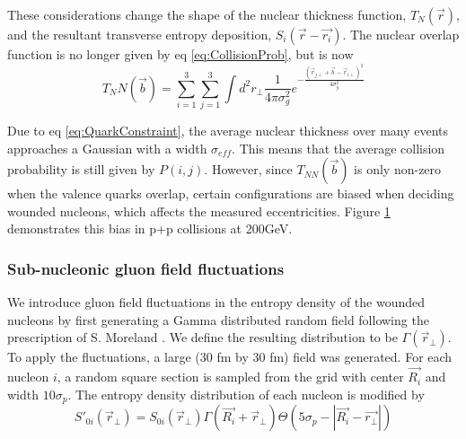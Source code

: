 \documentclass[preprint,showpacs,amsfonts,aps,prl,nofootinbib,floatfix]{revtex4}
\begin{document}
These considerations change the shape of the nuclear thickness function, $T_N(\vec{r})$, and the resultant transverse entropy deposition, $S_i(\vec{r}-\vec{r_i})$. The nuclear overlap function is no longer given by eq \ref{eq:CollisionProb}, but is now
\begin{equation}
	T_NN(\vec{b}) = \sum_{i=1}^{3}\sum_{j=1}^{3}\int{d^2r_\perp \frac{1}{4 \pi \sigma_g^2} e^{-\frac{(\vec{r}_{j\perp}+\vec{b}-\vec{r}_{i\perp})^2}{4 \sigma_g^2}}}
\end{equation}

Due to eq \ref{eq:QuarkConstraint}, the average nuclear thickness over many events approaches a Gaussian with a width $\sigma_{eff}$. This means that the average collision probability is still given by $P(i,j)$. However, since $T_{NN}(\vec{b})$ is only non-zero when the valence quarks overlap, certain configurations are biased when deciding wounded nucleons, which affects the measured eccentricities. Figure \ref{fig:CollisionComaprison} demonstrates this bias in p+p collisions at 200GeV.

\begin{figure}
	\caption{}
	\label{fig:CollisionComaprison}
\end{figure}


\subsubsection{Sub-nucleonic gluon field fluctuations}
\label{sec2b2}
We introduce gluon field fluctuations in the entropy density of the wounded nucleons by first generating a Gamma distributed random field following the prescription of S. Moreland \cite{Moreland:2012qw}. We define the resulting distribution to be $\Gamma(\vec{r}_\perp)$. To apply the fluctuations, a large (30 fm by 30 fm) field was generated. For each nucleon $i$, a random square section is sampled from the grid with center $\vec{R_i}$ and width $10\sigma_p$.  The entropy density distribution of each nucleon is modified by 
\begin{equation}
	S'_{0i}(\vec{r}_\perp) = S_{0i}(\vec{r}_\perp) \Gamma(\vec{R_i} + \vec{r}_\perp) \Theta(5\sigma_p - |{\vec{R_i}-\vec{r_\perp}}|)
\end{equation}
\end{document}
